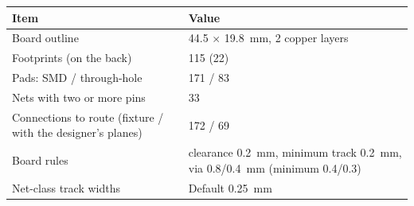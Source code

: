 \begin{tabular}{p{5.6cm}p{8.2cm}}
\toprule
Item & Value \\
\midrule
Board outline & 44.5 $\times$ 19.8~mm, 2 copper layers \\
Footprints (on the back) & 115 (22) \\
Pads: SMD / through-hole & 171 / 83 \\
Nets with two or more pins & 33 \\
Connections to route (fixture / with the designer's planes) & 172 / 69 \\
Board rules & clearance 0.2~mm, minimum track 0.2~mm, via 0.8/0.4~mm (minimum 0.4/0.3) \\
Net-class track widths & Default 0.25~mm \\
\bottomrule
\end{tabular}
